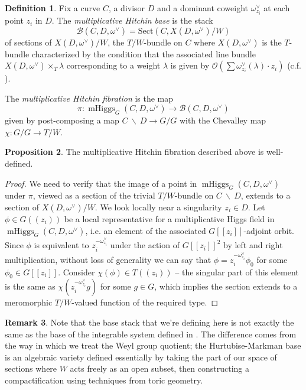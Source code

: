 \documentclass[11pt, oneside, reqno]{amsart}
\theoremstyle{definition} \newtheorem{definition}{Definition}[section]
\newtheorem{prop}[definition]{Proposition}
\theoremstyle{definition} \newtheorem{remark}[definition]{Remark}
\theoremstyle{definition} \newtheorem{remarks}[definition]{Remarks}
\theoremstyle{definition} \newtheorem{question}[definition]{Question}
\theoremstyle{definition} \newtheorem*{note}{Note}
\theoremstyle{definition} \newtheorem{example}[definition]{Example}
\theoremstyle{definition} \newtheorem{examples}[definition]{Examples}
\newcommand{\mr}[1]{\mathrm{#1}}
\newcommand{\mc}[1]{\mathcal{#1}}
\newcommand{\bs}{\ \backslash \ }
\newcommand{\OO}{\mathcal{O}}
\DeclareMathOperator{\mhiggs}{mHiggs}
\begin{document}
\begin{definition} \label{mult_Hitchin_system_def}
Fix a curve $C$, a divisor $D$ and a dominant coweight $\omega_{z_i}^\vee$ at each point $z_i$ in $D$.  The \emph{multiplicative Hitchin base} is the stack
\[\mc B(C,D,\omega^\vee) = \mr{Sect}(C, X(D,\omega^\vee)/W)\]
of sections of $X(D,\omega^\vee)/W$, the $T/W$-bundle on $C$ where $X(D,\omega^\vee)$ is the $T$-bundle characterized by the condition that the associated line bundle $X(D,\omega^\vee) \times_T {\lambda}$ corresponding to a weight $\lambda$ is given by $\OO(\sum \omega_{z_i}^\vee(\lambda) \cdot z_i)$ (c.f. \cite[Section 3.3]{HurtubiseMarkman}).

The \emph{multiplicative Hitchin fibration} is the map
\[\pi \colon \mhiggs_G(C,D,\omega^\vee) \to \mc B(C,D,\omega^\vee)\]
given by post-composing a map $C \bs D \to G/G$ with the Chevalley map $\chi \colon G/G \to T/W$.  
\end{definition}

\begin{prop}
The multiplicative Hitchin fibration described above is well-defined.
\end{prop}

\begin{proof}
We need to verify that the image of a point in $\mhiggs_G(C,D,\omega^\vee)$ under $\pi$, viewed as a section of the trivial $T/W$-bundle on $C \bs D$, extends to a section of $X(D,\omega^\vee)/W$.  We look locally near a singularity $z_i \in D$.  Let $\phi \in G((z_i))$ be a local representative for a multiplicative Higgs field in $\mhiggs_G(C,D,\omega^\vee)$, i.e. an element of the associated $G[[z_i]]$-adjoint orbit.  Since $\phi$ is equivalent to $z_i^{-\omega^\vee_{z_i}}$ under the action of $G[[z_i]]^2$ by left and right multiplication, without loss of generality we can say that $\phi = z_i^{-\omega^\vee_{z_i}} \phi_0$ for some $\phi_0 \in G[[z_i]]$.  Consider $\chi(\phi) \in T((z_i))$ -- the singular part of this element is the same as $\chi(z_i^{-\omega^\vee_{z_i}} g)$ for some $g \in G$, which implies the section extends to a meromorphic $T/W$-valued function of the required type.
\end{proof}

\begin{remark}
Note that the base stack that we're defining here is not exactly the same as the base of the integrable system defined in \cite{HurtubiseMarkman}.  The difference comes from the way in which we treat the Weyl group quotient; the Hurtubise-Markman base is an algebraic variety defined essentially by taking the part of our space of sections where $W$ acts freely as an open subset, then constructing a compactification using techniques from toric geometry.
\end{remark}
\end{document}
